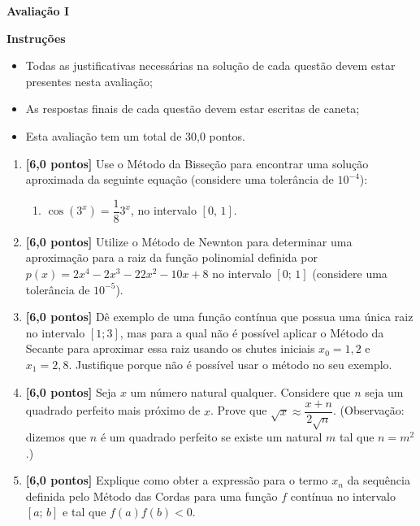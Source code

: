 \documentclass[12pt,a4paper]{article}
\begin{document}
\begin{center}
 \textbf{Avaliação I}
\end{center}

\textbf{Instruções}
\begin{itemize}
 \item Todas as justificativas necessárias na solução de cada questão devem 
 estar presentes nesta avaliação;
 \item As respostas finais de cada questão devem estar escritas de caneta;
 \item Esta avaliação tem um total de 30,0 pontos.
\end{itemize}

\begin{enumerate}
  \item \textbf{[6,0 pontos]} Use o Método da Bisseção para encontrar uma solução aproximada 
  da seguinte equação (considere uma tolerância de $10^{-4}$):
    \begin{enumerate}
      \item $\cos\left(3^x\right) = \dfrac{1}{8}3^x$, no intervalo $[0,\, 1]$.
   \end{enumerate}
  
  \item \textbf{[6,0 pontos]} Utilize o Método de Newnton para determinar uma aproximação 
  para a raiz da função polinomial definida por $p(x) = 2x^4 -2x^3 -22x^2 - 10x + 8$ no 
  intervalo $[0;\,1]$ (considere uma tolerância de $10^{-5}$).
  
  \item \textbf{[6,0 pontos]} Dê exemplo de uma função contínua que possua uma única raiz no intervalo $[1; 3]$,
  mas para a qual não é possível aplicar o Método da Secante para aproximar essa raiz usando
  os chutes iniciais $x_0 = 1,2$ e $x_1 = 2,8$. Justifique porque não é possível usar
  o método no seu exemplo.

  \item \textbf{[6,0 pontos]} Seja $x$ um número natural qualquer. Considere que $n$ seja um
  quadrado perfeito mais próximo de $x$. Prove que $\sqrt{x}\approx \dfrac{x+n}{2\sqrt{n}}$.
  (Observação: dizemos que $n$ é um quadrado perfeito se existe um natural $m$ tal que $n = m^2$.)

  \item \textbf{[6,0 pontos]} Explique como obter a expressão para o termo $x_n$ da sequência
  definida pelo Método das Cordas para uma função $f$ contínua no intervalo $[a;\,b]$ e tal
  que $f(a)f(b)<0$.

\end{enumerate}
\end{document}
